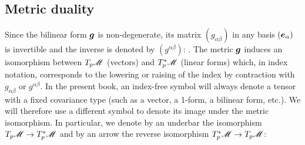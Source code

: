 \subsection{Metric duality} \label{s:bas:metric_dual}

Since the bilinear form $\bm{g}$ is non-degenerate, its matrix $(g_{\alpha\beta})$ in
any basis $(\bm{e}_\alpha)$ is invertible and the inverse is denoted by $(g^{\alpha\beta})$:
\be
  .
\ee
The metric $\bm{g}$ induces an isomorphism between
$T_p\mathscr{M}$ (vectors) and ${T_p^*\mathscr{M}}$ (linear forms) which, in  index notation,
corresponds to the lowering or
raising of the index by contraction
with $g_{\alpha\beta}$ or $g^{\alpha\beta}$.
In the present book, an index-free symbol will always denote
a tensor with a fixed covariance type (such as a vector, a 1-form,
a bilinear form, etc.). We will therefore use a different symbol
to denote its image under the metric isomorphism.
In particular, we denote by an underbar the
isomorphism $T_p\mathscr{M} \rightarrow {T_p^*\mathscr{M}}$
and by an arrow the reverse isomorphism ${T_p^*\mathscr{M}} \rightarrow T_p\mathscr{M}$:
